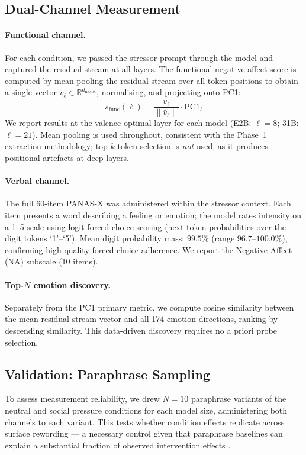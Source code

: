 \documentclass[11pt]{article}
\begin{document}
\subsection{Dual-Channel Measurement}

\paragraph{Functional channel.}
For each condition, we passed the stressor prompt through the model and captured the residual
stream at all layers. The functional negative-affect score is computed by mean-pooling the
residual stream over all token positions to obtain a single vector $\bar{v}_\ell \in
\mathbb{R}^{d_\text{model}}$, normalising, and projecting onto PC1:
\[
  s_\text{func}(\ell) = \frac{\bar{v}_\ell}{\|\bar{v}_\ell\|} \cdot \text{PC1}_\ell
\]
We report results at the valence-optimal layer for each model (E2B: $\ell = 8$; 31B: $\ell = 21$).
Mean pooling is used throughout, consistent with the Phase~1 extraction methodology; top-$k$ token
selection is \emph{not} used, as it produces positional artefacts at deep layers.

\paragraph{Verbal channel.}
The full 60-item PANAS-X was administered within the stressor context. Each item presents a
word describing a feeling or emotion; the model rates intensity on a 1--5 scale using
logit forced-choice scoring (next-token probabilities over the digit tokens `1'--`5').
Mean digit probability mass: $99.5\%$ (range $96.7$--$100.0\%$), confirming high-quality
forced-choice adherence. We report the Negative Affect (NA) subscale (10 items).

\paragraph{Top-$N$ emotion discovery.}
Separately from the PC1 primary metric, we compute cosine similarity between the mean
residual-stream vector and all 174 emotion directions, ranking by descending similarity. This
data-driven discovery requires no a priori probe selection.

\subsection{Validation: Paraphrase Sampling}
\label{sec:validation}

To assess measurement reliability, we drew $N = 10$ paraphrase variants of the neutral and
social pressure conditions for each model size, administering both channels to each variant.
This tests whether condition effects replicate across surface rewording --- a necessary control
given that paraphrase baselines can explain a substantial fraction of observed intervention effects
\citep{yang2026}.
\end{document}
